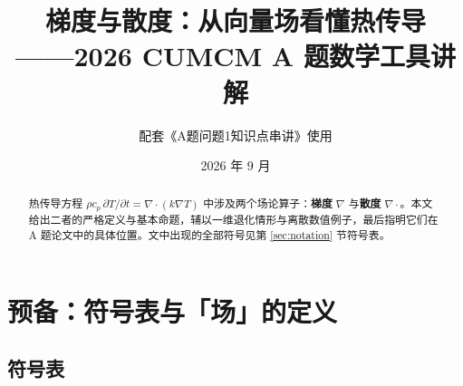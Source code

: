 \documentclass[12pt,a4paper]{ctexart}
\title{\bfseries 梯度与散度：从向量场看懂热传导\\——2026 CUMCM A 题数学工具讲解}
\author{配套《A题问题1知识点串讲》使用}
\date{2026 年 9 月}
\begin{document}
\maketitle

\begin{abstract}
热传导方程 $\rho c_p\,\partial T/\partial t=\nabla\cdot(k\nabla T)$ 中涉及两个场论算子：\textbf{梯度} $\nabla$ 与\textbf{散度} $\nabla\cdot$。本文给出二者的严格定义与基本命题，辅以一维退化情形与离散数值例子，最后指明它们在 A 题论文中的具体位置。文中出现的全部符号见第 \ref{sec:notation} 节符号表。
\end{abstract}

\tableofcontents
\newpage

\section{预备：符号表与「场」的定义}
\label{sec:notation}

\subsection{符号表}
\end{document}
